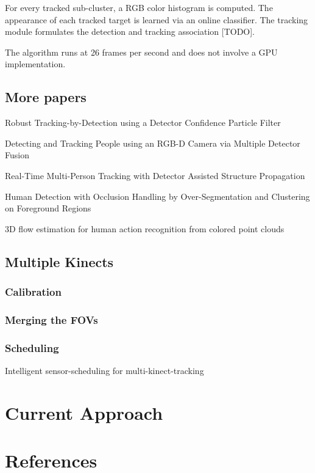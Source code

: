\documentclass[paper=a4, fontsize=11pt]{scrartcl}
\numberwithin{equation}{section}		%
\numberwithin{figure}{section}			%
\numberwithin{table}{section}				%
\begin{document}
For every tracked sub-cluster, a RGB color histogram is computed. The appearance of each tracked target is learned via an online classifier. The tracking module formulates the detection and tracking association [TODO].

The algorithm runs at 26 frames per second and does not involve a GPU implementation.

\subsection{More papers}

Robust Tracking-by-Detection using a Detector Confidence Particle Filter

Detecting and Tracking People using an RGB-D Camera via Multiple Detector
Fusion

Real-Time Multi-Person Tracking with Detector Assisted Structure Propagation

Human Detection with Occlusion Handling by Over-Segmentation and Clustering on Foreground Regions

3D flow estimation for human action recognition from colored point clouds

\subsection{Multiple Kinects}

\subsubsection{Calibration}

\subsubsection{Merging the FOVs}

\subsubsection{Scheduling}

Intelligent sensor-scheduling for multi-kinect-tracking

\section{Current Approach}

\section{References}
\end{document}
